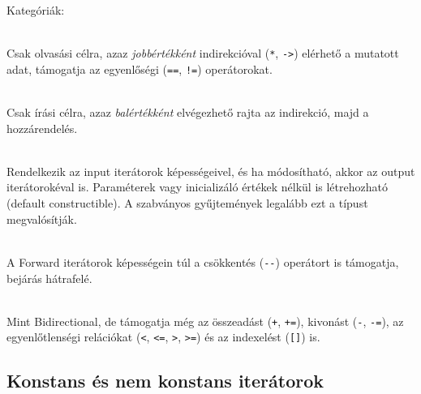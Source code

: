\begin{frame}
    Kategóriák:
    \begin{description}[m]
        \item[Input] \hfill \\ Csak olvasási célra, azaz \emph{jobbértékként} indirekcióval (\texttt{*}, \texttt{->}) elérhető a mutatott adat, támogatja az egyenlőségi (\texttt{==}, \texttt{!=}) operátorokat.
        \item[Output] \hfill \\ Csak írási célra, azaz \emph{balértékként} elvégezhető rajta az indirekció, majd a hozzárendelés.
        \item[Forward] \hfill \\ Rendelkezik az input iterátorok képességeivel, és ha módosítható, akkor az output iterátorokéval is. Paraméterek vagy inicializáló értékek nélkül is létrehozható (default constructible). A szabványos gyűjtemények legalább ezt a típust megvalósítják.
    \end{description}
\end{frame}

\begin{frame}
    \begin{description}[m]
        \small
        \item[Bidirectional] \hfill \\ A Forward iterátorok képességein túl a csökkentés (\texttt{-{-}}) operátort is támogatja, bejárás hátrafelé.
        \item[Random access] \hfill \\ Mint Bidirectional, de támogatja még az összeadást (\texttt{+}, \texttt{+=}), kivonást (\texttt{-}, \texttt{-=}), az egyenlőtlenségi relációkat (\texttt{<}, \texttt{<=}, \texttt{>}, \texttt{>=}) és az indexelést (\texttt{[]}) is. 
    \end{description}
    \begin{exampleblock}{}
        \scriptsize
        
    \end{exampleblock}
\end{frame}

\subsection{Konstans és nem konstans iterátorok}

